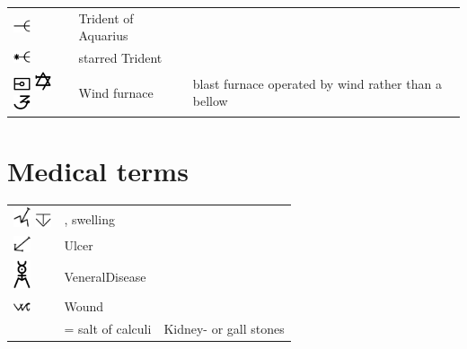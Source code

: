 \documentclass[british,final,landscape]{scrartcl}
\begin{document}
\begin{refsection}
\begin{supertabular}{p{0.3\textwidth}p{0.34\textwidth}p{0.34\textwidth}}
   \includegraphics[width=5mm]{Tools/Trident} & Trident of Aquarius & \\
   \includegraphics[width=5mm]{Tools/StarredTrident} & starred Trident & \\
   \includegraphics[width=5mm]{Tools/WindFurnace} \includegraphics[width=5mm]{Tools/WindFurnace2} \includegraphics[width=5mm]{Tools/WindFurnace3} & Wind furnace & blast furnace operated by wind rather than a bellow \\
  \end{supertabular}

\section{Medical terms}

 \tablelasttail{\bottomrule}
 \begin{supertabular}{p{0.3\textwidth}p{0.34\textwidth}p{0.34\textwidth}}
   \includegraphics[width=5mm]{Medical/Swelling} \includegraphics[width=5mm]{Medical/Swelling2} & , swelling & \\
   \includegraphics[width=5mm]{Medical/Ulcer} & Ulcer & \\
   \includegraphics[width=5mm]{Medical/VeneralDisease} & VeneralDisease & \\
   \includegraphics[width=5mm]{Medical/Wound} & Wound & \\
   &  = salt of calculi & Kidney- or gall stones \\
 \end{supertabular}



\end{refsection}
\end{document}
